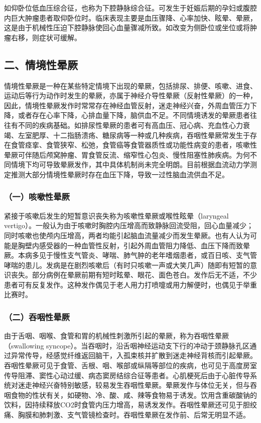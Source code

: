 如仰卧位低血压综合征，也称为下腔静脉综合征。可发生于妊娠后期的孕妇或腹腔内巨大肿瘤患者取仰卧位时。临床表现主要是血压骤降、心率加快、眩晕、晕厥，这是由于机械性压迫下腔静脉使回心血量骤减所致。如改变为侧卧位或坐位或将肿瘤右移，则症状可缓解。

\subsection{二、情境性晕厥}

情境性晕厥是一种在某些特定情境下出现的晕厥，包括排尿、排便、咳嗽、进食、运动后等行为动作时发生的晕厥，亦属于神经介导性晕厥（反射性晕厥）的一种，因此，情境性晕厥发作时常常存在神经血管反射，迷走神经兴奋，外周血管压力下降，或者存在心率下降，心排血量下降，脑供血不足。不同情境诱发的晕厥患者往往有不同的疾病基础。如排尿性晕厥的患者可有高血压、冠心病、充血性心力衰竭、左室肥厚、十二指肠溃疡、糖尿病等一种或几种疾病，吞咽性晕厥常发生于存在食管痉挛、食管狭窄、松弛，食管癌等食管器质性或功能性病变的患者，咳嗽性晕厥可伴随后颅窝肿瘤、胃食管反流、缩窄性心包炎、慢性阻塞性肺疾病。为何不同情境下均可导致晕厥发作，其中具体机制尚未完全明朗。目前根据血流动力学测定推测大部分情境性晕厥时存在血压下降，导致一过性脑血流供血不足。

\subsubsection{（一）咳嗽性晕厥}

紧接于咳嗽后发生的短暂意识丧失称为咳嗽性晕厥或喉性眩晕（laryngeal
vertigo）。一般认为由于咳嗽时胸腔内压增高而致静脉回流受阻，回心血量减少；同时咳嗽也使颅内压增高，两者均能引起脑血流量减少而发生晕厥。也有人认为可能是胸壁内感受器的一种血管性反射，引起外周血管阻力降低、血压下降而致晕厥。本病多见于慢性支气管炎、哮喘、肺气肿的老年嗜烟患者，或百日咳、支气管哮喘的患儿。发病是在剧烈咳嗽后（有时只咳嗽一声或大笑几声）随即有短暂的意识丧失。部分病例在晕厥前期有短时眩晕、眼花、面色苍白。发作后无不适，不少患者可有反复发作。这种发作偶见于老人用力打喷嚏或用力解便时，也偶见于举重比赛时。

\subsubsection{（二）吞咽性晕厥}

由于舌咽、咽喉、食管和胃的机械性刺激所引起的晕厥，称为吞咽性晕厥（swallowing
syncope）。当吞咽时，沿舌咽神经运动支下行的冲动于颈静脉孔区通过异常传导，经感觉纤维返回脑干，入孤束核并扩散到迷走神经背核而引起晕厥。吞咽性晕厥可见于食管、舌根、咽、喉部或纵隔等部位的疾病，也可见于高度房室传导阻滞、窦性心动过缓、病态窦房结综合征等患者。心肌梗死后由于心脏传导系统对迷走神经兴奋特别敏感，较易发生吞咽性晕厥。晕厥发作与体位无关，但与吞咽食物的性状有关，如硬物、冷、酸、咸、辣等食物易于诱发。饮用含重碳酸钠的饮料，因持续释放CO2时食管内压力增高，易诱发发作。吞咽性晕厥还可见于胆绞痛、胸膜和肺刺激、支气管镜检查时。吞咽性晕厥在发作前、后常无明显不适。

